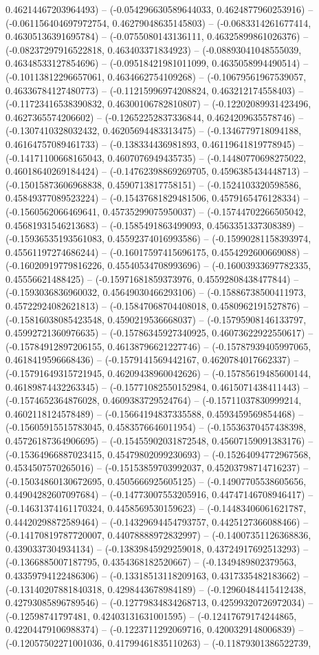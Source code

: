 0.46214467203964493) -- (-0.054296630589644033, 0.4624877960253916) -- (-0.061156404697972754, 0.46279048635145803) -- (-0.0683314261677414, 0.46305136391695784) -- (-0.0755080143136111, 0.46325899861026376) -- (-0.08237297916522818, 0.463403371834923) -- (-0.08893041048555039, 0.46348533127854696) -- (-0.09518421981011099, 0.4635058994490514) -- (-0.10113812296657061, 0.4634662754109268) -- (-0.10679561967539057, 0.46336784127480773) -- (-0.11215996974208824, 0.463212174558403) -- (-0.11723416538390832, 0.46300106782810807) -- (-0.12202089931423496, 0.4627365574206602) -- (-0.12652252837336844, 0.4624209635578746) -- (-0.1307410328032432, 0.46205694483313475) -- (-0.1346779718094188, 0.46164757089461733) -- (-0.138334436981893, 0.46119641819778945) -- (-0.14171100668165043, 0.4607076949435735) -- (-0.14480770698275022, 0.46018640269184424) -- (-0.14762398869269705, 0.4596385434448713) -- (-0.15015873606968838, 0.4590713817758151) -- (-0.1524103320598586, 0.45849377089523224) -- (-0.15437681829481506, 0.4579165476128334) -- (-0.1560562066469641, 0.45735299075950037) -- (-0.15744702266505042, 0.45681931546213683) -- (-0.1585491863499093, 0.4563351337308389) -- (-0.15936535193561083, 0.45592374016993586) -- (-0.15990281158393974, 0.45561197274686244) -- (-0.16017597415696175, 0.4554292600669088) -- (-0.16020919779816226, 0.45540534708993696) -- (-0.16003933697782335, 0.45556621488425) -- (-0.15971681859373976, 0.45592808438477844) -- (-0.1593036836960032, 0.45649030466293106) -- (-0.15886738500411973, 0.45722924082621813) -- (-0.15847068704408018, 0.4580962191527876) -- (-0.15816038085423548, 0.4590219536668037) -- (-0.15795908146133797, 0.45992721360976635) -- (-0.15786345927340925, 0.46073622922550617) -- (-0.15784912897206155, 0.46138796621227746) -- (-0.15787939405997065, 0.4618419596668436) -- (-0.1579141569442167, 0.4620784017662337) -- (-0.15791649315721945, 0.46209438960042626) -- (-0.15785619485600144, 0.46189874432263345) -- (-0.15771082550152984, 0.4615071438411443) -- (-0.1574652364876028, 0.4609383729524764) -- (-0.15711037830999214, 0.4602118124578489) -- (-0.15664194837335588, 0.4593459569854468) -- (-0.15605915515783045, 0.4583576646011954) -- (-0.15536370457438398, 0.45726187364906695) -- (-0.15455902031872548, 0.45607159091383176) -- (-0.15364966887023415, 0.45479802099230693) -- (-0.15264094772967568, 0.4534507570265016) -- (-0.15153859703992037, 0.45203798714716237) -- (-0.15034860130672695, 0.4505666925605125) -- (-0.14907705538605656, 0.44904282607097684) -- (-0.14773007553205916, 0.44747146708946417) -- (-0.14631374161170324, 0.4458569530159623) -- (-0.14483406061621787, 0.44420298872589464) -- (-0.14329694454793757, 0.4425127366088466) -- (-0.14170819787720007, 0.44078888972832997) -- (-0.14007351126368836, 0.4390337304934134) -- (-0.13839845929259018, 0.43724917692513293) -- (-0.1366885007187795, 0.4354368182520667) -- (-0.1349489802379563, 0.43359794122486306) -- (-0.13318513118209163, 0.4317335482183662) -- (-0.13140207881840318, 0.4298443678984189) -- (-0.12960484415412438, 0.42793085896789546) -- (-0.12779834834268713, 0.42599320726972034) -- (-0.12598741797481, 0.42403131631001595) -- (-0.12417679174244865, 0.42204479106988374) -- (-0.1223711292069716, 0.4200329148006839) -- (-0.12057502271001036, 0.41799461835110263) -- (-0.11879301386522739, 